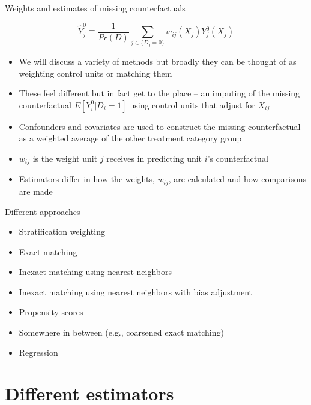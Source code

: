 \documentclass{beamer}
\begin{document}
\begin{frame}{Weights and estimates of missing counterfactuals}

$$\widehat{Y}^0_j \equiv \frac{1}{Pr(D)} \sum_{j \in \{D_j=0\}}w_{ij}(X_j) Y_j^0(X_j)$$

\begin{itemize}
	\item We will discuss a variety of methods but broadly they can be thought of as weighting control units or matching them 
	\item These feel different but in fact get to the place -- an imputing of the missing counterfactual $E[Y^0_i | D_i=1]$ using control units that adjust for $X_{ij}$
	\item Confounders and covariates are used to construct the missing counterfactual as a weighted average of the other treatment category group 
	\item $w_{ij}$ is the weight unit $j$ receives in predicting unit $i$'s counterfactual
	\item Estimators differ in how the weights, $w_{ij}$, are calculated and how comparisons are made
\end{itemize}

\end{frame}






\begin{frame}{Different approaches}
	
	\begin{itemize}
	\item Stratification weighting 
	\item Exact matching 
	\item Inexact matching using nearest neighbors
	\item Inexact matching using nearest neighbors with bias adjustment
	\item Propensity scores
	\item Somewhere in between (e.g., coarsened exact matching)
	\item Regression
	\end{itemize}
	

\end{frame}





\section{Different estimators }
\end{document}

